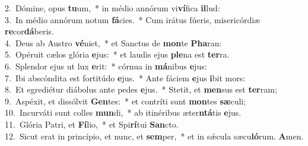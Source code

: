 {2.~}Dómine, opus \textbf{tu}um,~* in médio annórum vi\textbf{ví}fica \textbf{il}lud:\\
{3.~}In médio annórum notum \textbf{fá}cies.~* Cum irátus fúeris, misericórdiæ \textbf{re}cor\textbf{dá}beris.\\
{4.~}Deus ab Austro \textbf{vé}niet,~* et Sanctus de \textbf{mon}te \textbf{Pha}ran:\\
{5.~}Opéruit cælos glória \textbf{e}jus:~* et laudis ejus \textbf{ple}na est \textbf{ter}ra.\\
{6.~}Splendor ejus ut lux \textbf{e}rit:~* córnua in \textbf{má}nibus \textbf{e}jus:\\
{7.~}Ibi abscóndita est fortitúdo \textbf{e}jus.~* Ante fáciem \textbf{e}jus \textbf{i}bit mors:\\
{8.~}Et egrediétur diábolus ante pedes \textbf{e}jus.~* Stetit, et \textbf{men}sus est \textbf{ter}ram;\\
{9.~}Aspéxit, et dissólvit \textbf{Gen}tes:~* et contríti sunt \textbf{mon}tes \textbf{sæ}culi;\\
{10.~}Incurváti sunt colles \textbf{mun}di,~* ab itinéribus æter\textbf{ntá}tis \textbf{e}jus.\\
{11.~}Glória Patri, et \textbf{Fí}lio,~* et Spi\textbf{rí}tui \textbf{San}cto.\\
{12.~}Sicut erat in princípio, et nunc, et \textbf{sem}per,~* et in sǽcula sæcu\textbf{ló}rum. \textbf{A}men.\\
